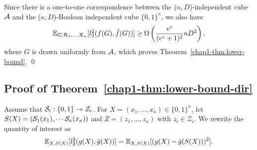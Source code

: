 {Since 
there is a one-to-one correspondence between the ($n,D$)-independent cube $\mathcal{A}$ 
and 
the ($\kappa,D$)-Boolean independent cube $\{0,1\}^\kappa$, we also have 
\[
  \mathbb{E}_{G,\mathcal{R}_1, \ldots, \mathcal{R}_n}[l_2^2(f(G), \hat{f}(G))] \geq \Omega \left(
  \frac{e^{\varepsilon}}{(e^{\varepsilon}+1)^2} n D^2 \right),
\]
where $G$ is drawn uniformly from $\mathcal{A}$, which proves Theorem~\ref{chap1-thm:lower-bound}. \qed

\subsection{Proof of
Theorem~\ref{chap1-thm:lower-bound-dir}}
\label{chap1-sub:proof_thm_lower-bound-dir}

Assume that $\mathcal{S}_i : \{0,1\} \rightarrow \mathcal{Z}_i$.
For 
$X = (x_1, \ldots, x_\kappa) \in \{0,1\}^\kappa$, 
let $S(X) = (\mathcal{S}_1(x_1), \cdots \mathcal{S}_\kappa(x_\kappa))$ and
$Z = (z_1, \ldots, z_\kappa)$ with $z_i \in \mathcal{Z}_i$. 
We rewrite the quantity of interest as
\[
  \mathbb{E}_{X, S(X)}[l_2^2(g(X), \hat{g}(X))] = \mathbb{E}_{X, S(X)}[(g(X)- \tilde{g}(S(X)))^2].
\]

}
